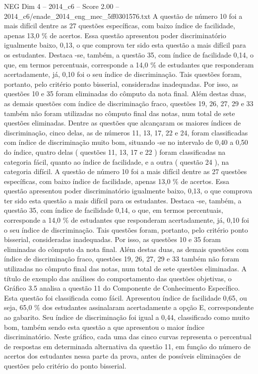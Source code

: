 \begin{textsample}{NEG Dim 4 – 2014\_c6 – Score 2.00 – 2014\_c6/enade\_2014\_eng\_mec\_5ff0301576.txt}
A questão de número 10 foi a mais difícil dentre as 27 questões específicas, com baixo índice de facilidade, apenas 13,0 \% de acertos.
Essa questão apresentou poder discriminatório igualmente baixo, 0,13, o que comprova ter sido esta questão a mais difícil para os estudantes.
Destaca -se, também, a questão 35, com índice de facilidade 0,14, o que, em termos percentuais, corresponde a 14,0 \% de estudantes que responderam acertadamente, já, 0,10 foi o seu índice de discriminação.
Tais questões foram, portanto, pelo critério ponto bisserial, consideradas inadequadas.
Por isso, as questões 10 e 35 foram eliminadas do cômputo da nota final.
Além destas duas, as demais questões com índice de discriminação fraco, questões 19, 26, 27, 29 e 33 também não foram utilizadas no cômputo final das notas, num total de sete questões eliminadas.
Dentre as questões que alcançaram os maiores índices de discriminação, cinco delas, as de números 11, 13, 17, 22 e 24, foram classificadas com índice de discriminação muito bom, situando -se no intervalo de 0,40 a 0,50 do índice, quatro delas ( questões 11, 13, 17 e 22 ) foram classificadas na categoria fácil, quanto ao índice de facilidade, e a outra ( questão 24 ), na categoria difícil.
A questão de número 10 foi a mais difícil dentre as 27 questões específicas, com baixo índice de facilidade, apenas 13,0 \% de acertos.
Essa questão apresentou poder discriminatório igualmente baixo, 0,13, o que comprova ter sido esta questão a mais difícil para os estudantes.
Destaca -se, também, a questão 35, com índice de facilidade 0,14, o que, em termos percentuais, corresponde a 14,0 \% de estudantes que responderam acertadamente, já, 0,10 foi o seu índice de discriminação.
Tais questões foram, portanto, pelo critério ponto bisserial, consideradas inadequadas.
Por isso, as questões 10 e 35 foram eliminadas do cômputo da nota final.
Além destas duas, as demais questões com índice de discriminação fraco, questões 19, 26, 27, 29 e 33 também não foram utilizadas no cômputo final das notas, num total de sete questões eliminadas.
A título de exemplo das análises do comportamento das questões objetivas, o Gráfico 3.5 analisa a questão 11 do Componente de Conhecimento Específico.
Esta questão foi classificada como fácil.
Apresentou índice de facilidade 0,65, ou seja, 65,0 \% dos estudantes assinalaram acertadamente a opção E, correspondente ao gabarito.
Seu índice de discriminação foi igual a 0,44, classificado como muito bom, também sendo esta questão a que apresentou o maior índice discriminatório.
Neste gráfico, cada uma das cinco curvas representa o percentual de respostas em determinada alternativa da questão 11, em função do número de acertos dos estudantes nessa parte da prova, antes de possíveis eliminações de questões pelo critério do ponto bisserial.

\end{textsample}
